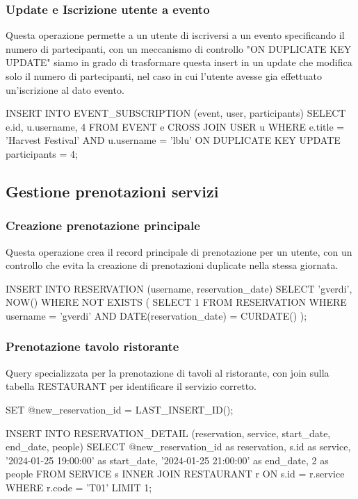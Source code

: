 \documentclass[a4paper,12pt]{report}
\begin{document}
\subsubsection{Update e Iscrizione utente a evento} 
Questa operazione permette a un utente di iscriversi a un evento specificando il numero di partecipanti, con un meccanismo di controllo "ON DUPLICATE KEY UPDATE" siamo in grado di trasformare questa insert in un update che modifica solo il numero di partecipanti, nel caso in cui l'utente avesse gia effettuato un'iscrizione al dato evento.

\begin{sqlcode}[caption={Query per iscrizione evento}]
INSERT INTO EVENT_SUBSCRIPTION (event, user, participants)
SELECT 
    e.id,
    u.username,
    4
FROM EVENT e
CROSS JOIN USER u
WHERE e.title = 'Harvest Festival' 
    AND u.username = 'lblu'
ON DUPLICATE KEY UPDATE participants = 4;
\end{sqlcode}



\subsection{Gestione prenotazioni servizi} 

\subsubsection{Creazione prenotazione principale} 
Questa operazione crea il record principale di prenotazione per un utente, con un controllo che evita la creazione di prenotazioni duplicate nella stessa giornata.

\begin{sqlcode}[caption={Query per creazione prenotazione principale}]
INSERT INTO RESERVATION (username, reservation_date)
SELECT 'gverdi', NOW()
WHERE NOT EXISTS (
    SELECT 1 FROM RESERVATION 
    WHERE username = 'gverdi' 
    AND DATE(reservation_date) = CURDATE()
);
\end{sqlcode}


\subsubsection{Prenotazione tavolo ristorante} 
Query specializzata per la prenotazione di tavoli al ristorante, con join sulla tabella RESTAURANT per identificare il servizio corretto.

\begin{sqlcode}[caption={Query per prenotazione tavolo ristorante}]
SET @new_reservation_id = LAST_INSERT_ID();

INSERT INTO RESERVATION_DETAIL (reservation, service, start_date, end_date, people)
SELECT 
    @new_reservation_id as reservation,
    s.id as service,
    '2024-01-25 19:00:00' as start_date,
    '2024-01-25 21:00:00' as end_date,
    2 as people
FROM SERVICE s
INNER JOIN RESTAURANT r ON s.id = r.service
WHERE r.code = 'T01'
LIMIT 1;
\end{sqlcode}
\end{document}
